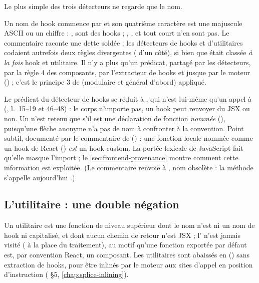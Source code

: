 Le plus simple des trois détecteurs ne regarde que le nom.


Un nom de hook commence par  et son quatrième caractère est une majuscule ASCII ou un chiffre : ,  sont des hooks ; , , et  tout court n'en sont pas. Le commentaire raconte une dette soldée : les détecteurs de hooks et d'utilitaires codaient autrefois deux règles divergentes ( d'un côté), si bien que  était classée \emph{à la fois} hook et utilitaire. Il n'y a plus qu'un prédicat, partagé par les détecteurs, par la règle 4 des composants, par l'extracteur de hooks et jusque par le moteur () ; c'est le principe 3 de  (\og modulaire et général d'abord\fg{}) appliqué.

Le prédicat du détecteur de hooks se réduit à , qui n'est lui-même qu'un appel à  (, l.~15--19 et 46--48) : le corps n'importe pas, un hook peut renvoyer du JSX ou non. Un  n'est retenu que s'il est une déclaration de fonction \emph{nommée} (), puisqu'une flèche anonyme n'a pas de nom à confronter à la convention. Point subtil, documenté par le commentaire de  () : une fonction locale nommée comme un hook de React () \emph{est} un hook custom. La portée lexicale de JavaScript fait qu'elle masque l'import ; le \cref{sec:frontend-provenance} montre comment cette information est exploitée. (Le commentaire renvoie à , nom obsolète : la méthode s'appelle aujourd'hui .)

\subsection{L'utilitaire : une double négation}


Un utilitaire est une fonction de niveau supérieur dont le nom n'est ni un nom de hook ni capitalisé, et dont aucun chemin de retour n'est JSX ; l' n'est jamais visité ( à la place du traitement), au motif qu'une fonction exportée par défaut est, par convention React, un composant. Les utilitaires sont abaissés en  () sans extraction de hooks, pour être inlinés par le moteur aux sites d'appel en position d'instruction ( §5, \cref{chap:splice-inlining}).

